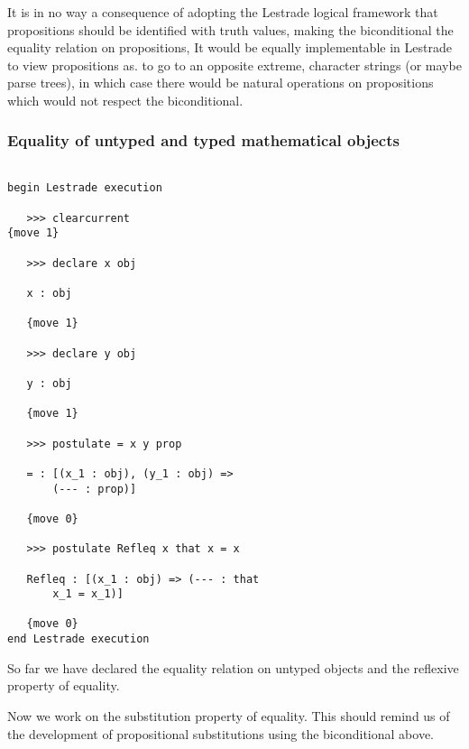 \documentclass[12pt]{article}
\begin{document}
It is in no way a consequence of adopting the Lestrade logical framework that propositions should be identified with truth values, making the biconditional the equality relation on propositions,  It would be equally implementable in Lestrade to view propositions as. to go to an opposite extreme, character strings (or maybe parse trees), in which case there would be natural operations on propositions which would not respect the biconditional.

\subsubsection{Equality of untyped and typed mathematical objects}

\begin{verbatim}

begin Lestrade execution

   >>> clearcurrent
{move 1}

   >>> declare x obj

   x : obj

   {move 1}

   >>> declare y obj

   y : obj

   {move 1}

   >>> postulate = x y prop

   = : [(x_1 : obj), (y_1 : obj) => 
       (--- : prop)]

   {move 0}

   >>> postulate Refleq x that x = x

   Refleq : [(x_1 : obj) => (--- : that 
       x_1 = x_1)]

   {move 0}
end Lestrade execution

\end{verbatim}

So far we have declared the equality relation on untyped objects and the reflexive property of equality.

Now we work on the substitution property of equality.  This should remind us of the development of propositional substitutions using the biconditional above.
\end{document}
